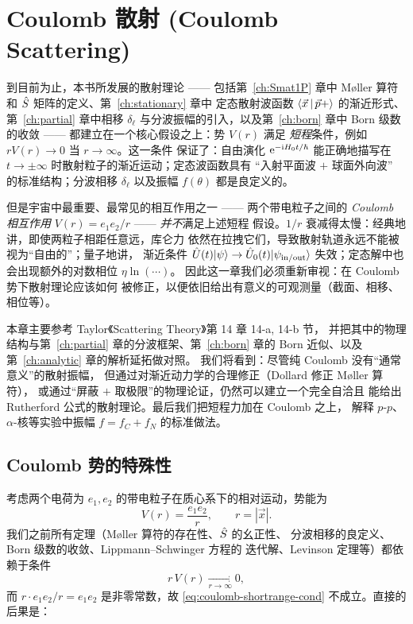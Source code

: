 \chapter{Coulomb 散射 (Coulomb Scattering)}\label{ch:coulomb}

到目前为止，本书所发展的散射理论 —— 包括第~\ref{ch:Smat1P} 章中
M{\o}ller 算符和 $\hat{S}$ 矩阵的定义、第~\ref{ch:stationary} 章中
定态散射波函数 $\left\langle \vec x \,\middle|\, \vec p+ \right\rangle$ 的渐近形式、第~\ref{ch:partial}
章中相移 $\delta_\ell$ 与分波振幅的引入，以及第~\ref{ch:born} 章中
Born 级数的收敛 —— 都建立在一个核心假设之上：势 $V(r)$ 满足
\emph{短程}条件，例如 $r V(r)\to 0$ 当 $r\to\infty$。这一条件
保证了：自由演化 $\mathrm{e}^{-\mathrm{i} H_0 t/\hbar}$ 能正确地描写在
$t\to\pm\infty$ 时散射粒子的渐近运动；定态波函数具有
``入射平面波 $+$ 球面外向波'' 的标准结构；分波相移 $\delta_\ell$
以及振幅 $f(\theta)$ 都是良定义的。

但是宇宙中最重要、最常见的相互作用之一 —— 两个带电粒子之间的
\emph{Coulomb 相互作用} $V(r)=e_1 e_2/r$ —— \emph{并不}满足上述短程
假设。$1/r$ 衰减得太慢：经典地讲，即使两粒子相距任意远，库仑力
依然在拉拽它们，导致散射轨道永远不能被视为``自由的''；量子地讲，
渐近条件 $\hat{U}(t)|\psi\rangle\to \hat{U}_0(t)|\psi_{\mathrm{in/out}}\rangle$
失效；定态解中也会出现额外的对数相位 $\eta\ln(\cdots)$。
因此这一章我们必须重新审视：在 Coulomb 势下散射理论应该如何
被修正，以便依旧给出有意义的可观测量（截面、相移、相位等）。

本章主要参考 Taylor《Scattering Theory》第 14 章 14-a, 14-b 节，
并把其中的物理结构与第~\ref{ch:partial} 章的分波框架、第~\ref{ch:born}
章的 Born 近似、以及第~\ref{ch:analytic} 章的解析延拓做对照。
我们将看到：尽管纯 Coulomb 没有``通常意义''的散射振幅，
但通过对渐近动力学的合理修正（Dollard 修正 M{\o}ller 算符），
或通过``屏蔽 $+$ 取极限''的物理论证，仍然可以建立一个完全自洽且
能给出 Rutherford 公式的散射理论。最后我们把短程力加在 Coulomb 之上，
解释 $p$-$p$、$\alpha$-核等实验中振幅 $f=f_C+f_N$ 的标准做法。

\section{Coulomb 势的特殊性}\label{sec:coulomb-special}

考虑两个电荷为 $e_1,e_2$ 的带电粒子在质心系下的相对运动，势能为
\begin{equation}
  V(r)=\frac{e_1 e_2}{r},\qquad r=|\vec x|.
  \label{eq:coulomb-V}
\end{equation}
我们之前所有定理（M{\o}ller 算符的存在性、$\hat{S}$ 的幺正性、
分波相移的良定义、Born 级数的收敛、Lippmann--Schwinger 方程的
迭代解、Levinson 定理等）都依赖于条件
\begin{equation}
  r\,V(r)\xrightarrow[r\to\infty]{}0,
  \label{eq:coulomb-shortrange-cond}
\end{equation}
而 $r\cdot e_1 e_2/r=e_1 e_2$ 是非零常数，故 \eqref{eq:coulomb-shortrange-cond}
不成立。直接的后果是：

